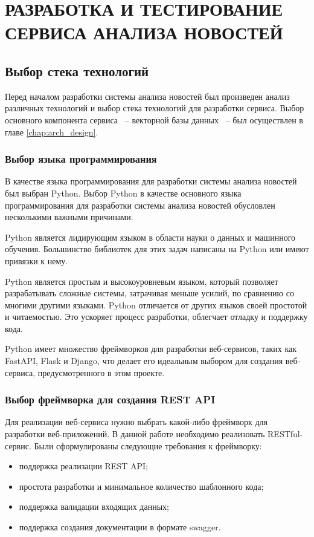 \chapter{РАЗРАБОТКА И ТЕСТИРОВАНИЕ СЕРВИСА АНАЛИЗА НОВОСТЕЙ}
\aftertitle

\section{Выбор стека технологий}

Перед началом разработки системы анализа новостей был произведен анализ различных технологий и выбор стека технологий для разработки сервиса. Выбор основного компонента сервиса ~-- векторной базы данных ~-- был осуществлен в главе \ref{chap:arch_design}.

\subsection{Выбор языка программирования}

В качестве языка программирования для разработки системы анализа новостей был выбран Python. Выбор Python в качестве основного языка программирования для разработки системы анализа новостей обусловлен несколькими важными причинами.

Python является лидирующим языком в области науки о данных и машинного обучения. Большинство библиотек для этих задач написаны на Python или имеют привязки к нему.

Python является простым и высокоуровневым языком, который позволяет разрабатывать сложные системы, затрачивая меньше усилий, по сравнению со многими другими языками. Python отличается от других языков своей простотой и читаемостью. Это ускоряет процесс разработки, облегчает отладку и поддержку кода.

Python имеет множество фреймворков для разработки веб-сервисов, таких как FastAPI, Flask и Django, что делает его идеальным выбором для создания веб-сервиса, предусмотренного в этом проекте.

\subsection{Выбор фреймворка для создания REST API}

Для реализации веб-сервиса нужно выбрать какой-либо фреймворк для разработки веб-приложений. В данной работе необходимо реализовать RESTful-сервис. Были сформулированы следующие требования к фреймворку:
\begin{itemize}
    \item поддержка реализации REST API;
    \item простота разработки и минимальное количество шаблонного кода;
    \item поддержка валидации входящих данных;
    \item поддержка создания документации в формате swagger.
\end{itemize}


